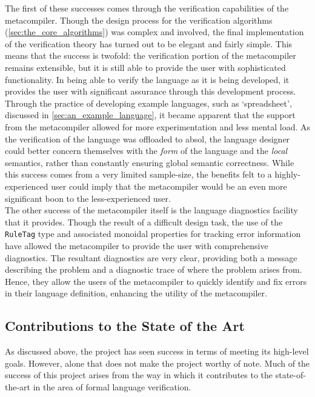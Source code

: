 The first of these successes comes through the verification capabilities of the metacompiler. 
Though the design process for the verification algorithms (\autoref{sec:the_core_algorithms}) was complex and involved, the final implementation of the verification theory has turned out to be elegant and fairly simple.
This means that the success is twofold: the verification portion of the metacompiler remains extensible, but it is still able to provide the user with sophisticated functionality.
In being able to verify the language as it is being developed, it provides the user with significant assurance through this development process.
Through the practice of developing example languages, such as `spreadsheet', discussed in \autoref{sec:an_example_language}, it became apparent that the support from the metacompiler allowed for more experimentation and less mental load.
As the verification of the language was offloaded to \gls{absol}, the language designer could better concern themselves with the \textit{form} of the language and the \textit{local} semantics, rather than constantly ensuring global semantic correctness.
While this success comes from a very limited sample-size, the benefits felt to a highly-experienced user could imply that the metacompiler would be an even more significant boon to the less-experienced user. \\

The other success of the metacompiler itself is the language diagnostics facility that it provides.
Though the result of a difficult design task, the use of the \texttt{RuleTag} type and associated monoidal properties for tracking error information have allowed the metacompiler to provide the user with comprehensive diagnostics.
The resultant diagnostics are very clear, providing both a message describing the problem and a diagnostic trace of where the problem arises from.
Hence, they allow the users of the metacompiler to quickly identify and fix errors in their language definition, enhancing the utility of the metacompiler.


\subsection{Contributions to the State of the Art} %
\label{sub:contributions_to_the_state_of_the_art}
As discussed above, the project has seen success in terms of meeting its high-level goals.
However, alone that does not make the project worthy of note.
Much of the success of this project arises from the way in which it contributes to the state-of-the-art in the area of formal language verification.\\

